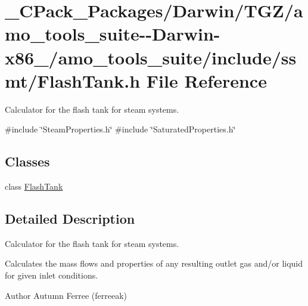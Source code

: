 \hypertarget{___c_pack___packages_2_darwin_2_t_g_z_2amo__tools__suite--_darwin-x86__64_2amo__tools__suite_2include_2ssmt_2_flash_tank_8h}{}\section{\+\_\+\+C\+Pack\+\_\+\+Packages/\+Darwin/\+T\+G\+Z/amo\+\_\+tools\+\_\+suite-\/-\/\+Darwin-\/x86\+\_/amo\+\_\+tools\+\_\+suite/include/ssmt/\+Flash\+Tank.h File Reference}
\label{___c_pack___packages_2_darwin_2_t_g_z_2amo__tools__suite--_darwin-x86__64_2amo__tools__suite_2include_2ssmt_2_flash_tank_8h}


Calculator for the flash tank for steam systems.  


{\ttfamily \#include \char`\"{}Steam\+Properties.\+h\char`\"{}}\newline
{\ttfamily \#include \char`\"{}Saturated\+Properties.\+h\char`\"{}}\newline
\subsection*{Classes}
\begin{DoxyCompactItemize}
\item 
class \hyperlink{class_flash_tank}{Flash\+Tank}
\end{DoxyCompactItemize}


\subsection{Detailed Description}
Calculator for the flash tank for steam systems. 

Calculates the mass flows and properties of any resulting outlet gas and/or liquid for given inlet conditions.

\begin{DoxyAuthor}{Author}
Autumn Ferree (ferreeak) 
\end{DoxyAuthor}
